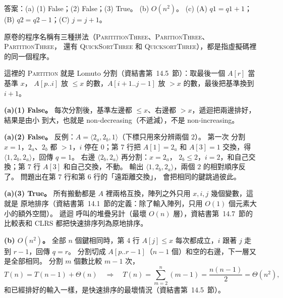 \begin{pastsoln}
答案：(a) (1) False；(2) False；(3) True。 (b) $O(n^2)$。 (c) (A) $q1 = q1 + 1$；
(B) $q2 = q2 - 1$；(C) $j = j + 1$。

原卷的程序名稱有三種拼法（\textsc{ParititionThree}、\textsc{ParitionThree}、\textsc{PartitionThree}，
還有 \textsc{QuickSortThree} 和 \textsc{QuicksortThree}），都是指虛擬碼裡的同一個程序。

這裡的 \textsc{Partition} 就是 Lomuto 分割（資結書第~14.5~節）：取最後一個 $A[r]$ 當基準 $x$，
$A[p..i]$ 放 $\le x$ 的數，$A[i+1..j-1]$ 放 $> x$ 的數，最後把基準換到 $i + 1$。

\textbf{(a)(1) False。} 每次分割後，基準左邊都 $\le x$、右邊都 $> x$，遞迴把兩邊排好，結果是由小
到大，也就是 non-decreasing（不遞減），不是 non-increasing。

\textbf{(a)(2) False。} 反例：$A = \langle 2_a, 2_b, 1\rangle$（下標只用來分辨兩個 $2$）。 第一次
分割 $x = 1$，$2_a$、$2_b$ 都 $> 1$，$i$ 停在 $0$；第 7 行把 $A[1] = 2_a$ 和 $A[3] = 1$ 交換，得
$\langle 1, 2_b, 2_a\rangle$，回傳 $q = 1$。 右邊 $\langle 2_b, 2_a\rangle$ 再分割：$x = 2_a$，
$2_b \le 2$，$i = 2$，和自己交換；第 7 行 $A[3]$ 和自己交換，不動。 輸出
$\langle 1, 2_b, 2_a\rangle$，兩個 $2$ 的相對順序反了。 問題出在第 7 行和第 6 行的「遠距離交換」，
會把相同的鍵跳過彼此。

\textbf{(a)(3) True。} 所有搬動都是 $A$ 裡兩格互換，陣列之外只用 $x, i, j$ 幾個變數，這就是
原地排序（資結書第~14.1~節的定義：除了輸入陣列，只用 $O(1)$ 個元素大小的額外空間）。 遞迴
呼叫的堆疊另計（最壞 $O(n)$ 層），資結書第~14.7~節的比較表和 CLRS 都把快速排序列為原地排序。

\textbf{(b) $O(n^2)$。} 全部 $n$ 個鍵相同時，第 4 行 $A[j] \le x$ 每次都成立，$i$ 跟著 $j$ 走到
$r - 1$，回傳 $q = r$。 分割切成 $A[p..r-1]$（$n - 1$ 個）和空的右邊，下一層又是全部相同。
分割 $m$ 個數比較 $m - 1$ 次，
\[
T(n) = T(n - 1) + \Theta(n) \quad\Longrightarrow\quad
T(n) = \sum_{m=2}^{n} (m - 1) = \frac{n(n-1)}{2} = \Theta(n^2),
\]
和已經排好的輸入一樣，是快速排序的最壞情況（資結書第~14.5~節）。


\end{pastsoln}

